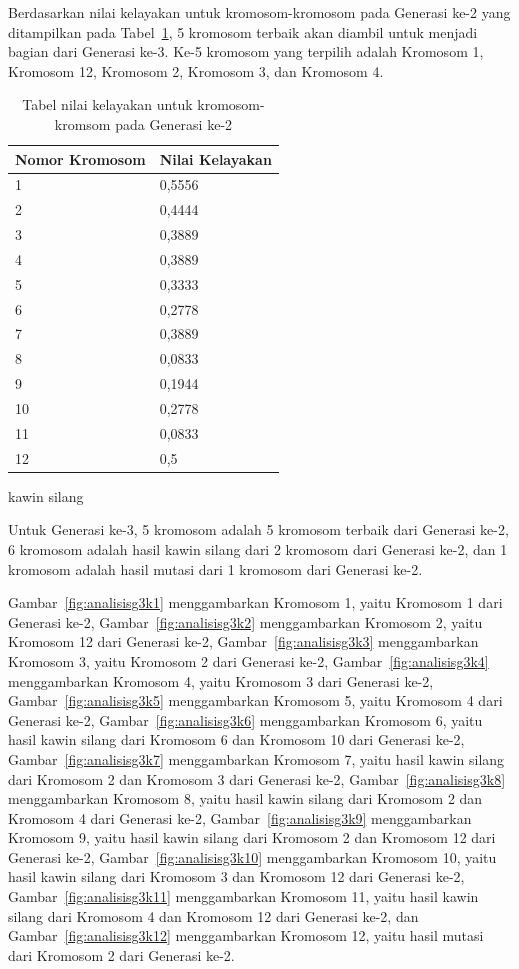 \clearpage

Berdasarkan nilai kelayakan untuk kromosom-kromosom pada Generasi ke-2 yang ditampilkan pada Tabel~\ref{tab:analisishg3}, 5 kromosom terbaik akan diambil untuk menjadi bagian dari Generasi ke-3. Ke-5 kromosom yang terpilih adalah Kromosom 1, Kromosom 12, Kromosom 2, Kromosom 3, dan Kromosom 4.

\begin{table}
\centering
\captionsetup{justification=centering}
\begin{tabular}{| l | l |}
\hline
Nomor Kromosom & Nilai Kelayakan \\
\hline \hline
1 & 0,5556 \\
\hline
2 & 0,4444 \\
\hline
3 & 0,3889 \\
\hline
4 & 0,3889 \\
\hline
5 & 0,3333 \\
\hline
6 & 0,2778 \\
\hline
7 & 0,3889 \\
\hline
8 & 0,0833 \\
\hline
9 & 0,1944 \\
\hline
10 & 0,2778 \\
\hline
11 & 0,0833 \\
\hline
12 & 0,5 \\
\hline
\end{tabular}
\caption[Tabel nilai kelayakan untuk kromosom-kromsom pada Generasi ke-1]{Tabel nilai kelayakan untuk kromosom-kromsom pada Generasi ke-2}
\label{tab:analisishg3}kawin silang
\end{table}

Untuk Generasi ke-3, 5 kromosom adalah 5 kromosom terbaik dari Generasi ke-2, 6 kromosom adalah hasil kawin silang dari 2 kromosom dari Generasi ke-2, dan 1 kromosom adalah hasil mutasi dari 1 kromosom dari Generasi ke-2.

Gambar~\ref{fig:analisisg3k1} menggambarkan Kromosom 1, yaitu Kromosom 1 dari Generasi ke-2, Gambar~\ref{fig:analisisg3k2} menggambarkan Kromosom 2, yaitu Kromosom 12 dari Generasi ke-2, Gambar~\ref{fig:analisisg3k3} menggambarkan Kromosom 3, yaitu Kromosom 2 dari Generasi ke-2, Gambar~\ref{fig:analisisg3k4} menggambarkan Kromosom 4, yaitu Kromosom 3 dari Generasi ke-2, Gambar~\ref{fig:analisisg3k5} menggambarkan Kromosom 5, yaitu Kromosom 4 dari Generasi ke-2, Gambar~\ref{fig:analisisg3k6} menggambarkan Kromosom 6, yaitu hasil kawin silang dari Kromosom 6 dan Kromosom 10 dari Generasi ke-2, Gambar~\ref{fig:analisisg3k7} menggambarkan Kromosom 7, yaitu hasil kawin silang dari Kromosom 2 dan Kromosom 3 dari Generasi ke-2, Gambar~\ref{fig:analisisg3k8} menggambarkan Kromosom 8, yaitu hasil kawin silang dari Kromosom 2 dan Kromosom 4 dari Generasi ke-2, Gambar~\ref{fig:analisisg3k9} menggambarkan Kromosom 9, yaitu hasil kawin silang dari Kromosom 2 dan Kromosom 12 dari Generasi ke-2, Gambar~\ref{fig:analisisg3k10} menggambarkan Kromosom 10, yaitu hasil kawin silang dari Kromosom 3 dan Kromosom 12 dari Generasi ke-2, Gambar~\ref{fig:analisisg3k11} menggambarkan Kromosom 11, yaitu hasil kawin silang dari Kromosom 4 dan Kromosom 12 dari Generasi ke-2, dan Gambar~\ref{fig:analisisg3k12} menggambarkan Kromosom 12, yaitu hasil mutasi dari Kromosom 2 dari Generasi ke-2.

